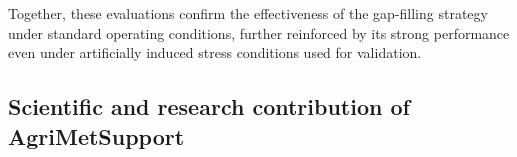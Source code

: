 \documentclass[authoryear,preprint,review,12pt]{elsarticle}
\newcommand{\statusblock}[3]{
    \ifthenelse{\equal{#2}{todo}}
        {\textcolor{red}{#1 (TO DO): #3}}
        {}
    \ifthenelse{\equal{#2}{wip}}
        {\textcolor{magenta}{#1 (IN PROGRESS): #3}}
        {}
    \ifthenelse{\equal{#2}{update}}
        {\textcolor{blue}{#1 (UPDATE): #3}}
        {}
    \ifthenelse{\equal{#2}{review}}
        {\textcolor{cyan}{#1 (REVIEW): #3}}
        {}
    \ifthenelse{\equal{#2}{done}}
        {\textcolor{PineGreen}{#1 (READY): #3}}
        {}
}
\begin{document}
Together, these evaluations confirm the effectiveness of the gap-filling strategy under standard operating conditions, further reinforced by its strong performance even under artificially induced stress conditions used for validation.

\subsection{Scientific and research contribution of Agri\-Met\-Support}\label{sec:Valuability}
    
\end{document}
